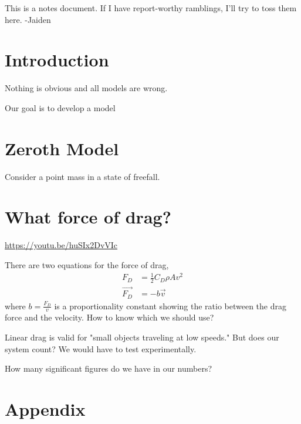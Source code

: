 \documentclass[12pt,journal,compsoc]{IEEEtran}
\begin{document}
This is a notes document. If I have report-worthy ramblings, I'll try to toss them here. -Jaiden



\section{Introduction}
Nothing is obvious and all models are wrong. 

Our goal is to develop a model 


\section{Zeroth Model}
Consider a point mass in a state of freefall. 


\section{What force of drag?}
\href{https://youtu.be/huSIx2DvVIc}{https://youtu.be/huSIx2DvVIc}

There are two equations for the force of drag,
\begin{align*}
F_D &= \frac12C_D\rho Av^2 \\
\vec{F_D} &= -b\vec{v}
\end{align*}
where $b=\frac{F_D}{v}$ is a proportionality constant showing the ratio between the drag force and the velocity. How to know which we should use?

Linear drag is valid for "small objects traveling at low speeds." But does our system count? We would have to test experimentally. 

How many significant figures do we have in our numbers?

\section{Appendix}
\end{document}
